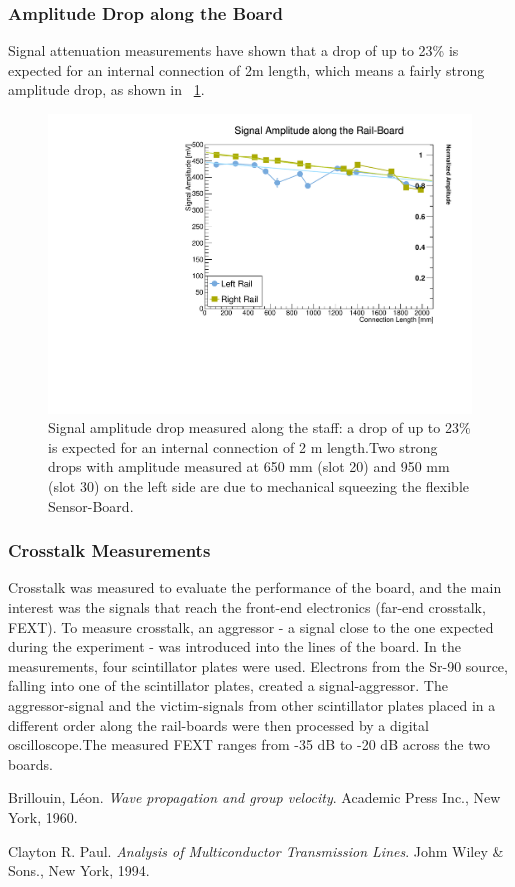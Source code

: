 \documentclass[../BTOF_summary.tex]{subfiles}
\begin{document}
\subsubsection{Amplitude Drop along the Board}
Signal attenuation measurements have shown that a drop of up to 23\% is expected for an internal connection of 2m length, which means a fairly strong amplitude drop, as shown in \fig~\ref{fig:SA}.

\begin{figure}[h!]
    \centering
    \includegraphics[scale=0.5]{Pictures/SignalAmplitude.pdf}
    \caption{Signal amplitude drop measured along the staff: a drop of up to 23\% is expected for an internal connection of 2 m length.Two strong drops with amplitude measured at 650 mm (slot 20) and 950 mm (slot 30) on the left side are due to mechanical squeezing the flexible Sensor-Board.}
    \label{fig:SA}
\end{figure}

\subsubsection{Crosstalk Measurements}
Crosstalk was measured to evaluate the performance of the board, and the main interest was the signals that  reach the front-end electronics (far-end crosstalk, FEXT). To measure crosstalk, an aggressor - a signal close to the one expected during the experiment - was introduced into the lines of the board. In the measurements, four scintillator plates were used. Electrons from the Sr-90 source, falling into one of the scintillator plates, created a signal-aggressor. The aggressor-signal and the victim-signals from other scintillator plates placed in a different order along the rail-boards were then processed by a digital oscilloscope.The measured FEXT ranges from -35 dB to -20 dB across the two boards.

\begin{thebibliography}{9}
Brillouin, Léon. 
\textit{Wave propagation and group velocity}. 
Academic Press Inc., New York, 1960.

Clayton R. Paul. 
\textit{Analysis of Multiconductor Transmission Lines}. 
Johm Wiley \& Sons., New York, 1994.

\end{thebibliography}
\end{document}
